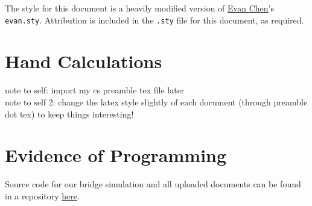\documentclass{scrartcl}
\begin{document}
\maketitle
\begin{foreword}
    The style for this document is a heavily modified version of \href{https://github.com/vEnhance}{Evan Chen}'s \texttt{evan.sty}. Attribution is included in the \texttt{.sty} file for this document, as required. 
\end{foreword}
\tableofcontents

\newpage

\section{Hand Calculations}
note to self: import my cs preamble tex file later \\[0.5em]
note to self 2: change the latex style slightly of each document (through preamble dot tex) to keep things interesting!

\section{Evidence of Programming}

\begin{foreword}
    Source code for our bridge simulation and all uploaded documents can be found in a repository \href{https://github.com/Car-XY/CIV-GOATS-Bridge-Sim/}{here}.
\end{foreword}
\end{document}
